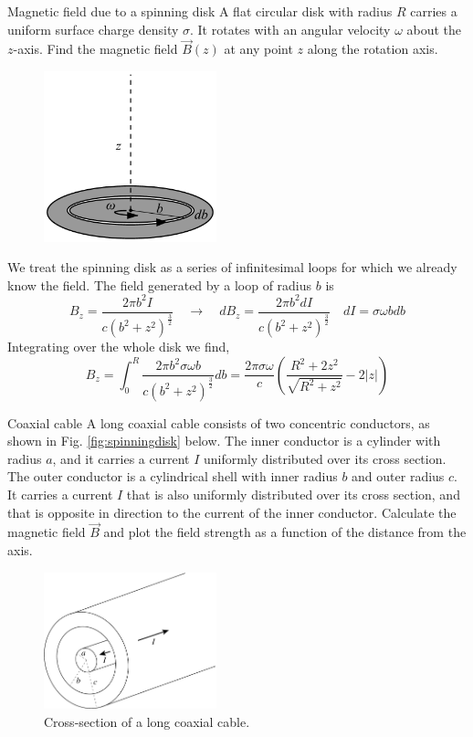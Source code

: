 \documentclass[makesolutionspdf]{esg8022pset}
\begin{document}
\begin{problem}{Magnetic field due to a spinning disk}
A flat circular disk with radius $R$ carries a uniform surface charge density
$\sigma$. It rotates with an angular velocity $\omega$ about the $z$-axis. 
Find the magnetic field $\vec{B}(z)$ at any point $z$ along the rotation axis.

   \begin{figure}[ht]
    \centering
    \includegraphics[width = 5cm]{Spinningdisk}
    \label{fig:spinningdisk}
  \end{figure}
  
\end{problem}
\begin{solution}
We treat the spinning disk as a
series of infinitesimal loops for which we already know the field. The
field generated by a loop of radius $b$ is
$$B_z = \frac{2\pi b^2 I}{c(b^2+z^2)^{\frac{3}{2}}}\quad\rightarrow\quad dB_z = \frac{2\pi b^2 dI}{c(b^2+z^2)^{\frac{3}{2}}} \quad dI = \sigma\omega bdb$$
 Integrating over the whole disk we find,
$$B_z = \int_0^R \frac{2\pi b^2 \sigma\omega
b}{c(b^2+z^2)^{\frac{3}{2}}}db =
\frac{2\pi\sigma\omega}{c}\left(\frac{R^2+2z^2}{\sqrt{R^2+z^2}}-2|z|\right)
$$
\end{solution}

\begin{problem}{Coaxial cable}
A long coaxial cable consists of two concentric conductors, as shown in Fig. \autoref{fig:spinningdisk} below.
The inner conductor is a cylinder with radius $a$, and it carries a current $I$ 
uniformly distributed over its cross section. The outer conductor is a cylindrical shell with 
inner radius $b$ and outer radius $c$. It carries a current $I$ that is also uniformly 
distributed over its cross section, and that is opposite in direction to the current of the 
inner conductor.  Calculate the magnetic field $\vec{B}$  and plot the field strength as a function of
the distance from the axis.

   \begin{figure}[ht]
    \centering
    \includegraphics[width = 5cm]{coax}
    \caption{Cross-section of a long coaxial cable.}   
    \label{fig:spinningdisk}
  \end{figure}
\end{problem}
\end{document}
